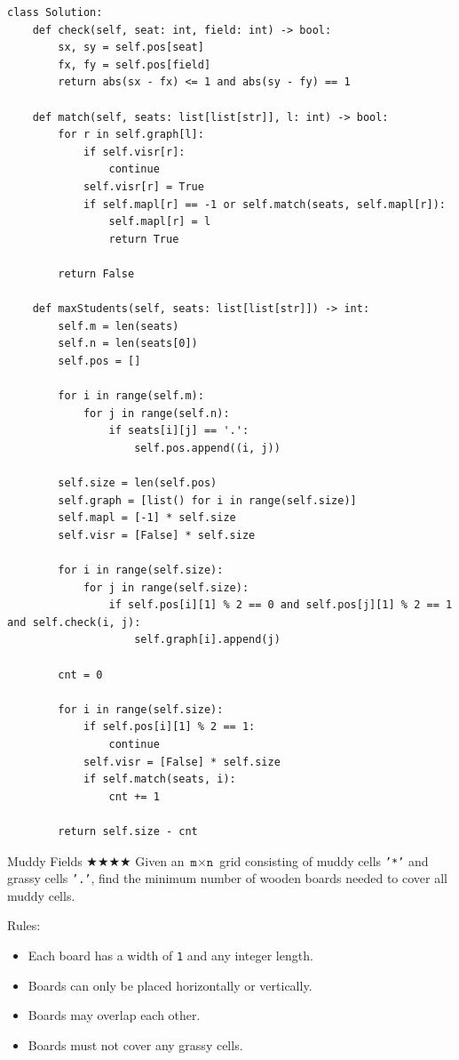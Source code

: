 \documentclass{article}
\begin{document}
\newpage

\begin{lstlisting}[style=python]
class Solution:
    def check(self, seat: int, field: int) -> bool:
        sx, sy = self.pos[seat]
        fx, fy = self.pos[field]
        return abs(sx - fx) <= 1 and abs(sy - fy) == 1

    def match(self, seats: list[list[str]], l: int) -> bool:
        for r in self.graph[l]:
            if self.visr[r]:
                continue
            self.visr[r] = True
            if self.mapl[r] == -1 or self.match(seats, self.mapl[r]):
                self.mapl[r] = l
                return True
                
        return False

    def maxStudents(self, seats: list[list[str]]) -> int:
        self.m = len(seats)
        self.n = len(seats[0])
        self.pos = []
        
        for i in range(self.m):
            for j in range(self.n):
                if seats[i][j] == '.':
                    self.pos.append((i, j))
                    
        self.size = len(self.pos)
        self.graph = [list() for i in range(self.size)]
        self.mapl = [-1] * self.size
        self.visr = [False] * self.size
        
        for i in range(self.size):
            for j in range(self.size):
                if self.pos[i][1] % 2 == 0 and self.pos[j][1] % 2 == 1 and self.check(i, j):
                    self.graph[i].append(j)
                    
        cnt = 0
        
        for i in range(self.size):
            if self.pos[i][1] % 2 == 1:
                continue
            self.visr = [False] * self.size
            if self.match(seats, i):
                cnt += 1
                
        return self.size - cnt
\end{lstlisting}

\begin{Question}{Muddy Fields $\bigstar\bigstar\bigstar\bigstar$}
Given an $\texttt{m}\times\texttt{n}$ grid consisting of muddy cells \texttt{'*'} and grassy cells \texttt{'.'}, find the minimum number of wooden boards needed to cover all muddy cells.

Rules:
\begin{itemize}
    \item Each board has a width of \texttt{1} and any integer length.
    \item Boards can only be placed horizontally or vertically.
    \item Boards may overlap each other.
    \item Boards must not cover any grassy cells.
\end{itemize}
\end{Question}
\end{document}
